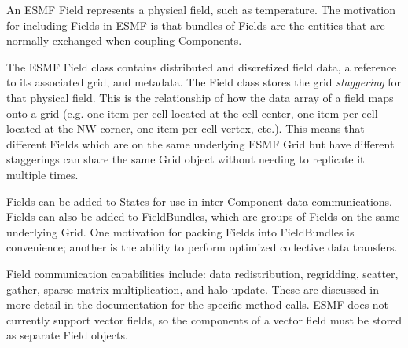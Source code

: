 
An ESMF Field represents a physical field, such as temperature.
The motivation for including Fields in ESMF is that bundles of 
Fields are the entities that are normally exchanged when coupling
Components.  

The ESMF Field class contains distributed and discretized field data, a reference 
to its associated grid, and metadata.  The Field class stores the grid {\it staggering}
for that physical field.
This is the relationship of how the data array of a field maps onto a grid 
(e.g. one item per
cell located at the cell center, one item per cell located at the NW
corner,  one item per cell vertex, etc.).  This means that different Fields
which are on the same underlying ESMF Grid but have different
staggerings can share the same Grid object without needing to replicate
it multiple times. 

Fields can be added to States for use in inter-Component
data communications.  Fields can also be added to FieldBundles,
which are groups of Fields on the same underlying Grid.  
One motivation for packing Fields into FieldBundles is convenience; 
another is the ability to perform optimized collective data transfers.  

Field communication capabilities include: data redistribution, regridding, scatter,
gather, sparse-matrix multiplication, and halo update.  These are discussed
in more detail in the documentation for the specific method calls.  
ESMF does not currently support vector fields, so the components of 
a vector field must be stored as separate Field objects.  
